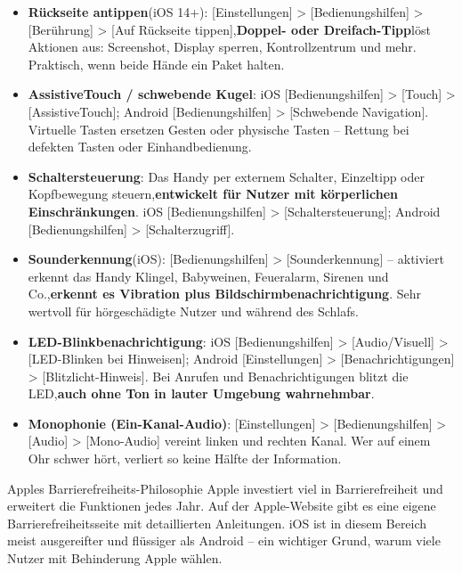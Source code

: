 \begin{itemize}
  \item \textbf{Rückseite antippen}(iOS 14+): [Einstellungen] > [Bedienungshilfen] > [Berührung] > [Auf Rückseite tippen],\textbf{Doppel- oder Dreifach-Tipp}löst Aktionen aus: Screenshot, Display sperren, Kontrollzentrum und mehr. Praktisch, wenn beide Hände ein Paket halten.
  \item \textbf{AssistiveTouch / schwebende Kugel}: iOS [Bedienungshilfen] > [Touch] > [AssistiveTouch]; Android [Bedienungshilfen] > [Schwebende Navigation]. Virtuelle Tasten ersetzen Gesten oder physische Tasten – Rettung bei defekten Tasten oder Einhandbedienung.
  \item \textbf{Schaltersteuerung}: Das Handy per externem Schalter, Einzeltipp oder Kopfbewegung steuern,\textbf{entwickelt für Nutzer mit körperlichen Einschränkungen}. iOS [Bedienungshilfen] > [Schaltersteuerung]; Android [Bedienungshilfen] > [Schalterzugriff].
  \item \textbf{Sounderkennung}(iOS): [Bedienungshilfen] > [Sounderkennung] – aktiviert erkennt das Handy Klingel, Babyweinen, Feueralarm, Sirenen und Co.,\textbf{erkennt es Vibration plus Bildschirmbenachrichtigung}. Sehr wertvoll für hörgeschädigte Nutzer und während des Schlafs.
  \item \textbf{LED-Blinkbenachrichtigung}: iOS [Bedienungshilfen] > [Audio/Visuell] > [LED-Blinken bei Hinweisen]; Android [Einstellungen] > [Benachrichtigungen] > [Blitzlicht-Hinweis]. Bei Anrufen und Benachrichtigungen blitzt die LED,\textbf{auch ohne Ton in lauter Umgebung wahrnehmbar}.
  \item \textbf{Monophonie (Ein-Kanal-Audio)}: [Einstellungen] > [Bedienungshilfen] > [Audio] > [Mono-Audio] vereint linken und rechten Kanal. Wer auf einem Ohr schwer hört, verliert so keine Hälfte der Information.
\end{itemize}

\begin{tcbinfo}{Apples Barrierefreiheits-Philosophie}
Apple investiert viel in Barrierefreiheit und erweitert die Funktionen jedes Jahr. Auf der Apple-Website gibt es eine eigene Barrierefreiheitsseite mit detaillierten Anleitungen. iOS ist in diesem Bereich meist ausgereifter und flüssiger als Android – ein wichtiger Grund, warum viele Nutzer mit Behinderung Apple wählen.

\end{tcbinfo}

